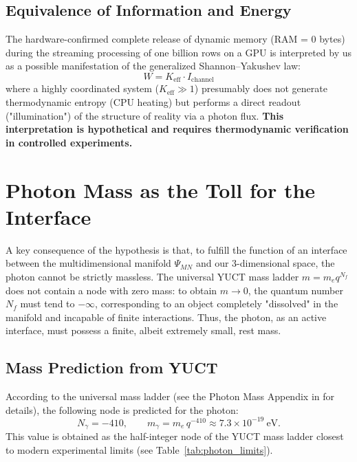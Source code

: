 \documentclass[11pt,a4paper]{article}
\begin{document}
	\subsection{Equivalence of Information and Energy}
	The hardware-confirmed complete release of dynamic memory (RAM = 0 bytes) during the streaming processing of one billion rows on a GPU is interpreted by us as a possible manifestation of the generalized Shannon–Yakushev law:
	\begin{equation}
		W = K_{\mathrm{eff}} \cdot I_{\mathrm{channel}}
	\end{equation}
	where a highly coordinated system ($K_{\mathrm{eff}} \gg 1$) presumably does not generate thermodynamic entropy (CPU heating) but performs a direct readout ("illumination") of the structure of reality via a photon flux. \textbf{This interpretation is hypothetical and requires thermodynamic verification in controlled experiments.}
	
	\section{Photon Mass as the Toll for the Interface}
	\label{sec:photon_mass}
	
	A key consequence of the hypothesis is that, to fulfill the function of an interface between the multidimensional manifold $\Psi_{MN}$ and our 3-dimensional space, the photon cannot be strictly massless. The universal YUCT mass ladder $m = m_e q^{N_f}$ does not contain a node with zero mass: to obtain $m \to 0$, the quantum number $N_f$ must tend to $-\infty$, corresponding to an object completely "dissolved" in the manifold and incapable of finite interactions. Thus, the photon, as an active interface, must possess a finite, albeit extremely small, rest mass.
	
	\subsection{Mass Prediction from YUCT}
	According to the universal mass ladder (see the Photon Mass Appendix in \cite{yuct_zenodo} for details), the following node is predicted for the photon:
	\begin{equation}
		\boxed{N_\gamma = -410}, \qquad
		\boxed{m_\gamma = m_e \, q^{-410} \approx 7.3 \times 10^{-19}~\text{eV}} .
	\end{equation}
	This value is obtained as the half-integer node of the YUCT mass ladder closest to modern experimental limits (see Table~\ref{tab:photon_limits}).
	
\end{document}
